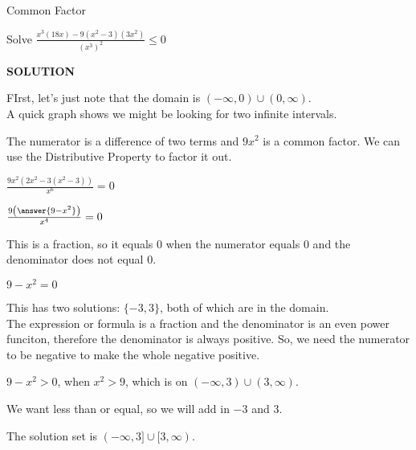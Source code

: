 \documentclass{ximera}
\begin{document}
\begin{example}  Common Factor


Solve $\frac{x^3 (18x) - 9(x^2-3)(3x^2)}{(x^3)^2} \leq 0$



\textbf{\textcolor{purple!50!blue!90!black}{SOLUTION}}

FIrst, let's just note that the domain is $(-\infty, 0) \cup (0, \infty)$. \\

A quick graph shows we might be looking for two infinite intervals.



\begin{center}
\end{center}







The numerator is a difference of two terms and $9 x^2$ is a common factor.  We can use the Distributive Property to factor it out.



$\frac{9x^2 (2x^2 - 3(x^2-3))}{x^6} = 0$


$\frac{9 \left( \answer{9 - x^2} \right)}{x^4} = 0$



This is a fraction, so it equals $0$ when the numerator equals $0$ and the denominator does not equal $0$.


$9 - x^2 = 0$

This has two solutions: $\{ -3, 3  \}$, both of which are in the domain. \\


The expression or formula is a fraction and the denominator is an even power funciton, therefore the denominator is always positive. So, we need the numerator to be negative to make the whole negative positive.


$9 - x^2 > 0$, when $x^2 > 9$, which is on $(-\infty, 3) \cup (3, \infty)$.

We want less than or equal, so we will add in $-3$ and $3$.


The solution set is $(-\infty, 3] \cup [3, \infty)$.


\end{example}
\end{document}
